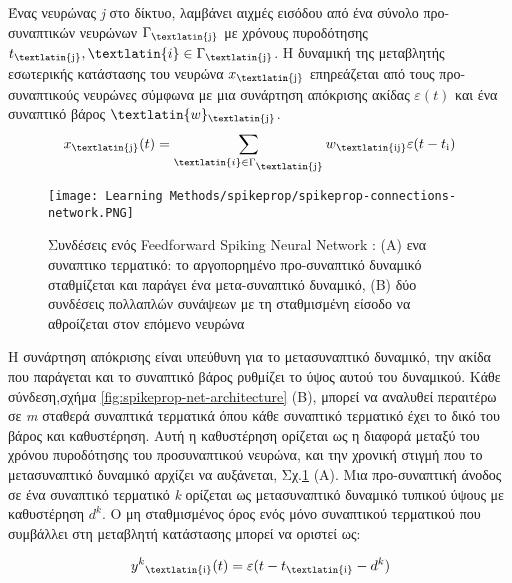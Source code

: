 \documentclass[12pt]{report}
\begin{document}
Ένας νευρώνας \textit{\textlatin{j}} στο δίκτυο, λαμβάνει αιχμές εισόδου από ένα σύνολο προ-συναπτικών νευρώνων \(\Gamma\textsubscript{\textlatin{j}}\) με χρόνους πυροδότησης \(t\textsubscript{\textlatin{j}},\textlatin{i}\in\Gamma\textsubscript{\textlatin{j}}\). Η δυναμική της μεταβλητής εσωτερικής κατάστασης του νευρώνα \(x\textsubscript{\textlatin{j}}\) επηρεάζεται από τους προ-συναπτικούς νευρώνες σύμφωνα με μια συνάρτηση απόκρισης ακίδας \(\varepsilon(t)\) και ένα συναπτικό βάρος \(\textlatin{w}\textsubscript{\textlatin{j}}\).
\begin{equation}
    x\textsubscript{\textlatin{j}}(t) = \sum_{\textlatin{i}\in\Gamma\textsubscript{\textlatin{j}}} w\textsubscript{\textlatin{ij}}\varepsilon(t-t\textsubscript{i})
\end{equation}

\begin{figure}[htp]
    \centering
    \texttt{[image: Learning Methods/spikeprop/spikeprop-connections-network.PNG]}
    \caption{Συνδέσεις ενός \textlatin{Feedforward Spiking Neural Network} : (A) ενα συναπτικο τερματικό: το αργοπορημένο
προ-συναπτικό δυναμικό σταθμίζεται και παράγει ένα μετα-συναπτικό δυναμικό, (Β)
δύο συνδέσεις πολλαπλών συνάψεων με τη σταθμισμένη είσοδο να αθροίζεται στον επόμενο νευρώνα}
    \label{fig:spikeprop-connections-network}
\end{figure}

Η συνάρτηση απόκρισης είναι υπεύθυνη για το μετασυναπτικό δυναμικό, την ακίδα που παράγεται και το συναπτικό βάρος ρυθμίζει το ύψος αυτού του δυναμικού. Κάθε σύνδεση,σχήμα \ref{fig:spikeprop-net-architecture} (B), μπορεί να αναλυθεί περαιτέρω σε \textit{\textlatin{m}} σταθερά συναπτικά τερματικά όπου κάθε συναπτικό τερματικό έχει το δικό του βάρος και καθυστέρηση. Αυτή η καθυστέρηση ορίζεται ως η διαφορά μεταξύ του χρόνου πυροδότησης του προσυναπτικού νευρώνα, και την χρονική στιγμή που το μετασυναπτικό δυναμικό αρχίζει να αυξάνεται, Σχ.\ref{fig:spikeprop-connections-network} (A). Μια προ-συναπτική άνοδος σε ένα συναπτικό τερματικό \textit{k} ορίζεται ως μετασυναπτικό δυναμικό τυπικού ύψους με καθυστέρηση \(d^k\). Ο μη σταθμισμένος όρος ενός μόνο συναπτικού τερματικού που συμβάλλει στη μεταβλητή κατάστασης μπορεί να οριστεί ως:

\begin{equation}
    y^k\textsubscript{\textlatin{i}}(t) = \varepsilon(t-t\textsubscript{\textlatin{i}}-d^k) 
\end{equation}
\end{document}
